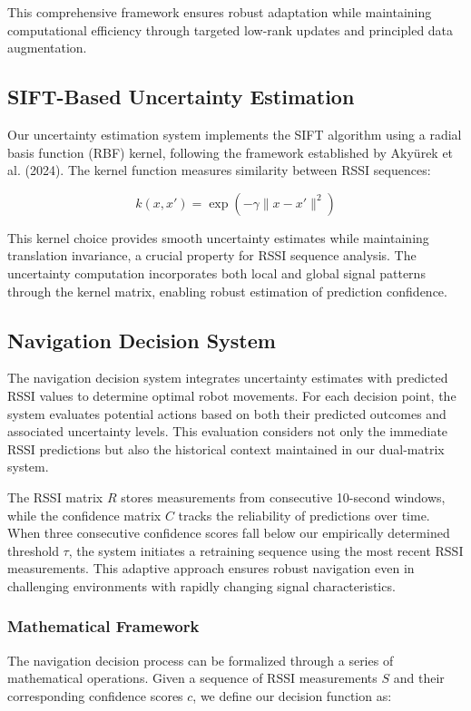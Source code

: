 \documentclass[12pt]{article}
\begin{document}
This comprehensive framework ensures robust adaptation while maintaining computational efficiency through targeted low-rank updates and principled data augmentation.


\subsection{SIFT-Based Uncertainty Estimation}

Our uncertainty estimation system implements the SIFT algorithm using a radial basis function (RBF) kernel, following the framework established by Akyürek et al. (2024). The kernel function measures similarity between RSSI sequences:

\[
k(x,x') = \exp(-\gamma\|x - x'\|^2)
\]

This kernel choice provides smooth uncertainty estimates while maintaining translation invariance, a crucial property for RSSI sequence analysis. The uncertainty computation incorporates both local and global signal patterns through the kernel matrix, enabling robust estimation of prediction confidence.

\subsection{Navigation Decision System}

The navigation decision system integrates uncertainty estimates with predicted RSSI values to determine optimal robot movements. For each decision point, the system evaluates potential actions based on both their predicted outcomes and associated uncertainty levels. This evaluation considers not only the immediate RSSI predictions but also the historical context maintained in our dual-matrix system.

The RSSI matrix $R$ stores measurements from consecutive 10-second windows, while the confidence matrix $C$ tracks the reliability of predictions over time. When three consecutive confidence scores fall below our empirically determined threshold $\tau$, the system initiates a retraining sequence using the most recent RSSI measurements. This adaptive approach ensures robust navigation even in challenging environments with rapidly changing signal characteristics.

\subsubsection{Mathematical Framework}

The navigation decision process can be formalized through a series of mathematical operations. Given a sequence of RSSI measurements \( S \) and their corresponding confidence scores \( c \), we define our decision function as:
\end{document}
